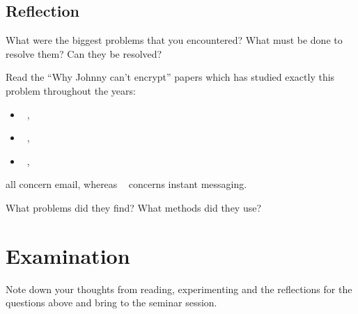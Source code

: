 \subsection{Reflection}

What were the biggest problems that you encountered?
What must be done to resolve them?
Can they be resolved?

Read the \enquote{Why Johnny can't encrypt} papers which has studied exactly 
this problem throughout the years:
\begin{itemize}
  \item {}~\cite{WhyJohnnyCantEncrypt},
  \item {}~\cite{WhyJohnnyStillCantEncrypt},
  \item {}~\cite{WhyJohnnyStillStillCantEncrypt},
\end{itemize}
all concern email, whereas 
~\cite{CanJohnnyFinallyEncrypt} concerns 
instant messaging.

What problems did they find?
What methods did they use?


\section{Examination}

Note down your thoughts from reading, experimenting and the reflections for the 
questions above and bring to the seminar session.


\printbibliography

